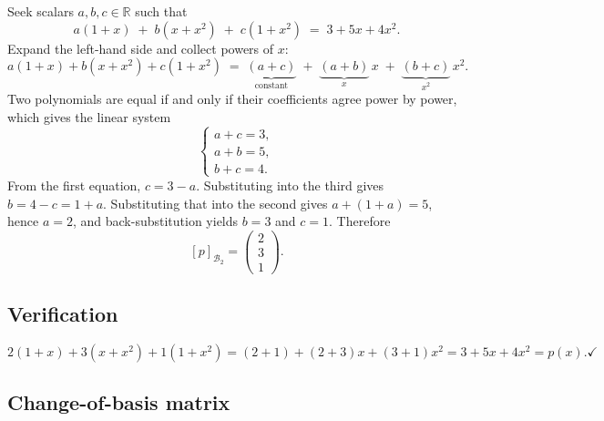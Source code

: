 \documentclass[11pt]{article}
\theoremstyle{definition}
\begin{document}
Seek scalars $a, b, c \in \mathbb{R}$ such that
\[
  a(1+x) \;+\; b(x+x^2) \;+\; c(1+x^2) \;=\; 3 + 5x + 4x^2 .
\]
Expand the left-hand side and collect powers of $x$:
\[
  a(1+x) + b(x+x^2) + c(1+x^2)
  \;=\; \underbrace{(a+c)}_{\text{constant}}
  \;+\; \underbrace{(a+b)}_{x}\, x
  \;+\; \underbrace{(b+c)}_{x^2}\, x^2 .
\]
Two polynomials are equal if and only if their coefficients agree power
by power, which gives the linear system
\[
  \begin{cases}
    a + c = 3, \\
    a + b = 5, \\
    b + c = 4.
  \end{cases}
\]
From the first equation, $c = 3 - a$. Substituting into the third gives
$b = 4 - c = 1 + a$. Substituting that into the second gives
$a + (1+a) = 5$, hence $a = 2$, and back-substitution yields $b = 3$ and
$c = 1$. Therefore
\[
  [p]_{\mathcal{B}_2} = \begin{pmatrix} 2 \\ 3 \\ 1 \end{pmatrix}.
\]

\subsection*{Verification}

\[
  2(1+x) + 3(x+x^2) + 1(1+x^2)
  = (2+1) + (2+3)x + (3+1)x^2
  = 3 + 5x + 4x^2 = p(x). \checkmark
\]

\subsection*{Change-of-basis matrix}
\end{document}
